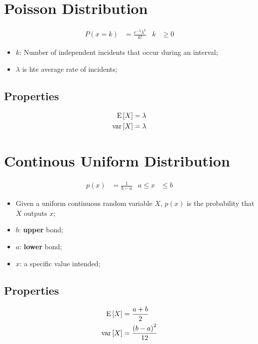 \section{Poisson Distribution}

  \begin{align}
    P\left( x = k \right) &= \frac{ e^{-\lambda} \lambda^{k} }{k!} & k &\ge 0
  \end{align}

  \begin{itemize}
    \item $ k $: Number of independent incidents that occur during an interval;
    \item $ \lambda $ is hte average rate of incidents;
  \end{itemize}
  
  \subsection{Properties}
  
    \begin{align}
      \operatorname{E}\left[ X \right] &= \lambda \\
      \operatorname{var}\left[ X \right] &= \lambda
    \end{align}
  
\section{Continous Uniform Distribution}
  
  \begin{align}
    p \left( x \right) &= \frac{1}{b - a} & a \leq x &\leq b
  \end{align}
  
  \begin{itemize}
    \item Given a uniform continuous random variable $ X $, $ p \left( x \right) $ is the probability that $ X $ outputs $ x $;
    \item $ b $: \textbf{upper} bond;
    \item $ a $: \textbf{lower} bond;
    \item $ x $: a specific value intended;
  \end{itemize}
  
  \subsection{Properties}
  
    \begin{align}
      \operatorname{E} \left[ X \right] &= \frac{a + b}{2} \\
      \operatorname{var} \left[ X \right] &= \frac{\left( b - a \right)^{2}}{12}
    \end{align}

